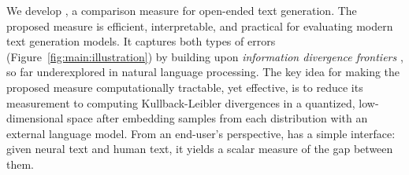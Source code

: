 \documentclass{article}
\theoremstyle{definition}
\newcommand{\name}{{\fontfamily{bch}\selectfont{\textsc{Mauve}}}\xspace}
\begin{document}
%
%
We develop \name, 
a comparison measure for open-ended text generation.
The proposed measure is efficient, interpretable, and practical for evaluating modern text generation models. 
It captures both types of errors (Figure~\ref{fig:main:illustration})
by building upon \textit{information divergence frontiers} \citep{sajjadi2018assessing,kynknniemi2019improved,djolonga2020precision}, so far underexplored in natural language processing.
%
The key idea for making the proposed measure computationally tractable, yet effective, is to reduce its measurement to computing Kullback-Leibler divergences in a quantized, low-dimensional space after embedding samples from each distribution with an external language model.
From an end-user's perspective, \name has a simple interface:
given neural text and human text, it yields a scalar measure of the gap between them.

%
%
%
%
%
%
%
%

%
%
%
%
%
%
%
%
%
%
%
%
\end{document}
